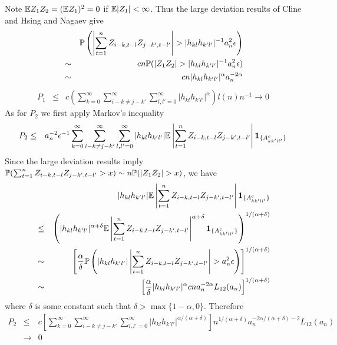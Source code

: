 \documentclass{article}
\begin{document}
Note $\mathbb{E} Z_1 Z_2 = (\mathbb{E} Z_1)^2 = 0$ if $\mathbb{E}|Z_1| < \infty$. Thus the
large deviation results of Cline and Hsing \cite{ClingHsing1998} and
Nagaev \cite{nagaev1979} give
\begin{eqnarray*}
  && \mathbb{P}\left(
    \left| \sum_{t=1}^n  Z_{i-k,t-l} Z_{j-k',t-l'}
    \right| > | h_{kl} h_{k'l'}|^{-1} a_n^2 \epsilon 
  \right) \\
  &\sim& c n \mathbb{P}(|Z_1 Z_2| > | h_{kl} h_{k'l'}|^{-1} a_n^2 \epsilon) \\
  &\sim& c n | h_{kl} h_{k'l'}|^{\alpha} a_n^{-2\alpha}
\end{eqnarray*}
\begin{eqnarray*}
  P_1 &\leq& c \left( \sum_{k=0}^\infty \sum_{i-k \neq j-k'}^\infty
  \sum_{l,l'=0}^\infty | h_{kl} h_{k'l'}|^{\alpha} \right) l(n) n^{-1}
\to 0
\end{eqnarray*}
As for $P_2$ we first apply Markov's inequality
\begin{eqnarray*}
  P_2 &\leq& a_n^{-2} \epsilon^{-1}
  \sum_{k=0}^\infty \sum_{i-k \neq j-k'}^\infty
  \sum_{l,l'=0}^\infty | h_{kl} h_{k'l'}| \mathbb{E} \left|
  \sum_{t=1}^n  Z_{i-k,t-l} Z_{j-k',t-l'} \right|
  \mathbf{1}_{\{A^c_{kk'll'}\}}
\end{eqnarray*}
Since the large deviation results imply $\mathbb{P}(\sum_{t=1}^n  Z_{i-k,t-l}
Z_{j-k',t-l'} > x) \sim n \mathbb{P}(|Z_1 Z_2| > x)$, we have
\begin{eqnarray*}
  && | h_{kl} h_{k'l'}| \mathbb{E} \left| \sum_{t=1}^n  Z_{i-k,t-l} Z_{j-k',t-l'} \right|
  \mathbf{1}_{\{A^c_{kk'll'}\}} \\
  &\leq& \left(
    | h_{kl} h_{k'l'}|^{\alpha + \delta} \mathbb{E} \left| \sum_{t=1}^n
      Z_{i-k,t-l} Z_{j-k',t-l'} \right|^{\alpha + \delta}
    \mathbf{1}_{\{A^c_{kk'll'}\}} \right)^{1/(\alpha + \delta)} \\
    &\sim& \left[
      {\alpha \over \delta} \mathbb{P}\left(
      | h_{kl} h_{k'l'}| \left| \sum_{t=1}^n  Z_{i-k,t-l} Z_{j-k',t-l'}
      \right| > a_n^2 \epsilon \right) \right]^{1/(\alpha + \delta)} \\
  &\sim& \left[
    {\alpha \over \delta} | h_{kl} h_{k'l'}|^{\alpha}
    c n a_n^{-2\alpha} L_{12}(a_n)
    \right]^{1/(\alpha + \delta)}
\end{eqnarray*}
where $\delta$ is some constant such that $\delta > \max\{1-\alpha,
0\}$. Therefore
\begin{eqnarray*}
  P_2 &\leq& c  \left[\sum_{k=0}^\infty \sum_{i-k \neq j-k'}^\infty
  \sum_{l,l'=0}^\infty |h_{kl} h_{k'l'}|^{\alpha/(\alpha + \delta)}\right]
  n^{1/(\alpha + \delta)} a_n^{-2\alpha/(\alpha + \delta )-2} L_{12}(a_n)\\
  &\to&  0
\end{eqnarray*}
\end{document}
